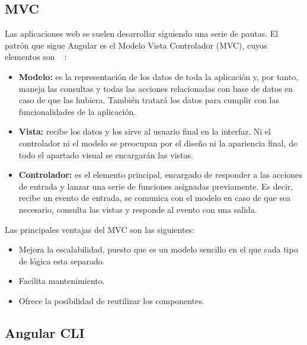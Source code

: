 \documentclass[a4paper, 12pt]{book}
\begin{document}
\subsection{MVC} 
\label{sec:mvc}

Las aplicaciones web se suelen desarrollar siguiendo una serie de pautas. El patrón que sigue Angular es el Modelo Vista Controlador (MVC), cuyos elementos son ~\cite{mvc} :

\begin{itemize}
  
	\item \textbf{Modelo:} es la representación de los datos de toda la aplicación y, por tanto, maneja las consultas y todas las acciones relacionadas con base de datos en caso de que las hubiera. También tratará los datos para cumplir con las funcionalidades de la aplicación.
 
	\item \textbf{Vista:} recibe los datos y los sirve al usuario final en la interfaz. Ni el controlador ni el modelo se preocupan por el diseño ni la apariencia final, de todo el apartado visual se encargarán las vistas.

	\item \textbf{Controlador:} es el elemento principal, encargado de responder a las acciones de entrada y lanzar una serie de funciones asignadas previamente. Es decir, recibe un evento de entrada, se comunica con el modelo en caso de que sea necesario, consulta las vistas y responde al evento con una salida.

\end{itemize}

Las principales ventajas del MVC son las siguientes:

\begin{itemize}
  
	\item Mejora la escalabilidad, puesto que es un modelo sencillo en el que cada tipo de lógica esta separado.
 
	\item Facilita mantenimiento.

	\item Ofrece la posibilidad de reutilizar los componentes.

\end{itemize}

\subsection{Angular CLI} 
\label{sec:angularcli}
\end{document}
